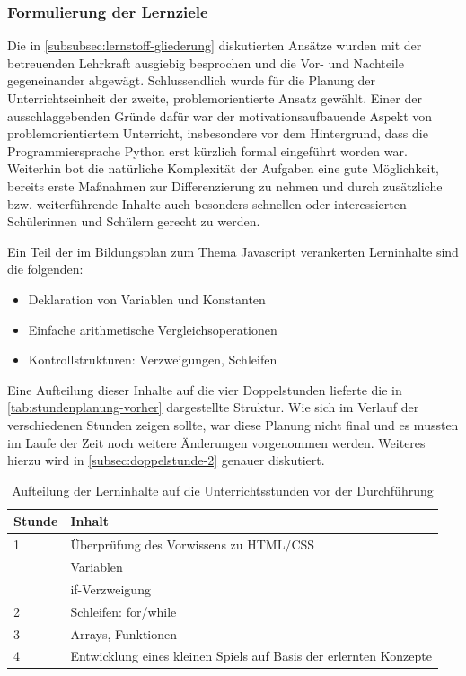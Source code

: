\subsubsection{Formulierung der Lernziele}
\label{subsubsec:formulierung-lernziele}

Die in \autoref{subsubsec:lernstoff-gliederung} diskutierten Ansätze wurden mit der betreuenden Lehrkraft ausgiebig besprochen und die Vor- und Nachteile gegeneinander abgewägt.
Schlussendlich wurde für die Planung der Unterrichtseinheit der zweite, problemorientierte Ansatz gewählt.
Einer der  ausschlaggebenden Gründe dafür war der motivationsaufbauende Aspekt von problemorientiertem Unterricht, insbesondere vor dem Hintergrund, dass die Programmiersprache Python erst kürzlich formal eingeführt worden war.
Weiterhin bot die natürliche Komplexität der Aufgaben eine gute Möglichkeit, bereits erste Maßnahmen zur Differenzierung zu nehmen und durch zusätzliche bzw. weiterführende Inhalte auch besonders schnellen oder interessierten Schülerinnen und Schülern gerecht zu werden.

Ein Teil der im Bildungsplan zum Thema Javascript verankerten Lerninhalte \cite[BPE~19]{bildungsplan-tg-informatik} sind die folgenden:

\begin{itemize}
	\item Deklaration von Variablen und Konstanten
	\item Einfache arithmetische Vergleichsoperationen
	\item Kontrollstrukturen: Verzweigungen, Schleifen
\end{itemize}

Eine Aufteilung dieser Inhalte auf die vier Doppelstunden lieferte die in \autoref{tab:stundenplanung-vorher} dargestellte Struktur.
Wie sich im Verlauf der verschiedenen Stunden zeigen sollte, war diese Planung nicht final und es mussten im Laufe der Zeit noch weitere Änderungen vorgenommen werden.
Weiteres hierzu wird in \autoref{subsec:doppelstunde-2} genauer diskutiert.

\begin{table}[h!]
	\begin{tabular*}{\linewidth}{l|l}
		\hline
		\textbf{Stunde} & \textbf{Inhalt}\\
		\hline
		1 & Überprüfung des Vorwissens zu HTML/CSS\\
		& Variablen\\
		& if-Verzweigung\\
		\hline
		2 & Schleifen: for/while\\
		\hline
		3 & Arrays, Funktionen\\
		\hline
		4 & Entwicklung eines kleinen Spiels auf Basis der erlernten Konzepte\\
		\hline
	\end{tabular*}
	\caption{Aufteilung der Lerninhalte auf die Unterrichtsstunden vor der Durchführung}
	\label{tab:stundenplanung-vorher}
\end{table}

